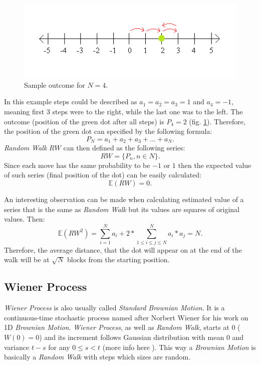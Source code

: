         \begin{figure}[H]
            \centering
            \includegraphics{img/numberLine_end.png}
            \caption{Sample outcome for $N=4$.}
            \label{fig:numberLine_end}
        \end{figure}
        In this example steps could be described as $a_1 = a_2 = a_3 = 1$ and $a_4 = -1$, meaning first 3 steps were to the right, while the last one was to the left. The outcome (position of the green dot after all steps) is $P_4 = 2$ (fig. \ref{fig:numberLine_end}).
        Therefore, the position of the green dot can specified by the following formula:
        \[  %
        P_N = a_1 + a_2 + a_3 + \ldots + a_N
        .
        \]
        \textit{Random Walk} $RW$ can then defined as the following series:
        \[
        RW = \{P_n, n \in N\}
        .
        \]
        Since each move has the same probability to be $-1$ or $1$ then the expected value of such series (final position of the dot) can be easily calculated:
        \[
        \mathbb{E}(RW) = 0
        .
        \]
        
        An interesting observation can be made when calculating estimated value of a series that is the same as \textit{Random Walk} but its values are squares of original values.
        Then:
        \[
        \mathbb{E}({RW}^2) = \sum_{i=1}^{N} a_{i} + 2*\sum_{1 \leq i \leq j \leq N}^{N} a_{i}*a_{j} = N
        .
        \]
        Therefore, the average distance, that the dot will appear on at the end of the walk will be at \(\sqrt{N}\) blocks from the starting position.
        
    \subsection{Wiener Process}
        \textit{Wiener Process} is also usually called \textit{Standard Brownian Motion}. It is a continuous-time stochastic process named after Norbert Wiener for his work on 1D \textit{Brownian Motion}.
        \textit{Wiener Process}, as well as \textit{Random Walk}, starts at 0 (\( W(0) = 0 \)) and its increment follows Gaussian distribution with mean \(0\) and variance \(t-s\) for any \(0\leq s < t \) (more info here \cite{wienerProcess}).
        This way a \textit{Brownian Motion} is basically a \textit{Random Walk} with steps which sizes are random.
        
